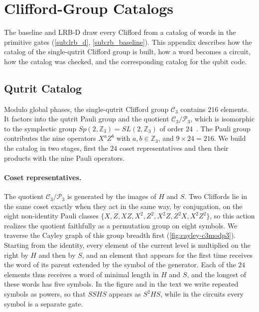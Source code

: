 \section{Clifford-Group Catalogs}
\label{sec:clifford-gen}

The baseline and LRB-D draw every Clifford from a catalog of words in the primitive gates (\autoref{sub:lrb_d}, \autoref{sub:rb_baseline}). This appendix describes how the catalog of the single-qutrit Clifford group is built, how a word becomes a circuit, how the catalog was checked, and the corresponding catalog for the qubit code.

\subsection{Qutrit Catalog}
\label{app:catalog-qutrit}

Modulo global phases, the single-qutrit Clifford group $\mathcal{C}_3$ contains $216$ elements. It factors into the qutrit Pauli group and the quotient $\mathcal{C}_3 / \mathcal{P}_3$, which is isomorphic to the symplectic group $Sp(2,\mathbb{Z}_3) = SL(2,\mathbb{Z}_3)$ of order $24$~\cite{Appleby2005,Hostens2005}. The Pauli group contributes the nine operators $X^a Z^b$ with $a,b \in \mathbb{Z}_3$, and $9 \times 24 = 216$. We build the catalog in two stages, first the $24$ coset representatives and then their products with the nine Pauli operators.

\paragraph{Coset representatives.}
The quotient $\mathcal{C}_3/\mathcal{P}_3$ is generated by the images of $H$ and $S$. Two Cliffords lie in the same coset exactly when they act in the same way, by conjugation, on the eight non-identity Pauli classes $\{X, Z, XZ, X^2, Z^2, X^2Z, Z^2X, X^2Z^2\}$, so this action realizes the quotient faithfully as a permutation group on eight symbols. We traverse the Cayley graph of this group breadth first (\autoref{fig:cayley-c3modp3}). Starting from the identity, every element of the current level is multiplied on the right by $H$ and then by $S$, and an element that appears for the first time receives the word of its parent extended by the symbol of the generator. Each of the $24$ elements thus receives a word of minimal length in $H$ and $S$, and the longest of these words has five symbols. In the figure and in the text we write repeated symbols as powers, so that $SSHS$ appears as $S^2HS$, while in the circuits every symbol is a separate gate.

